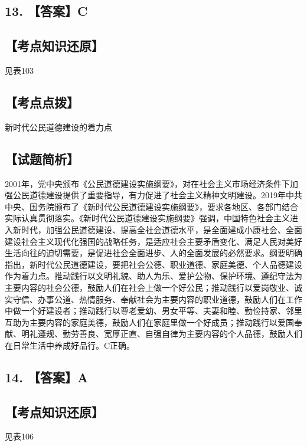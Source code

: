\documentclass[UTF8,11pt]{ctexart}
\begin{document}
\subsection*{13. 【答案】C}

\subsection*{【考点知识还原】}

见表103


\subsection*{【考点点拨】}

新时代公民道德建设的着力点


\subsection*{【试题简析】}

2001年，党中央颁布《公民道德建设实施纲要》，对在社会主义市场经济条件下加强公民道德建设提供了重要指导，有力促进了社会主义精神文明建设。2019年中共中央、国务院颁布了《新时代公民道德建设实施纲要》，要求各地区、各部门结合实际认真贯彻落实。《新时代公民道德建设实施纲要》强调，中国特色社会主义进入新时代，加强公民道德建设、提高全社会道德水平，是全面建成小康社会、全面建设社会主义现代化强国的战略任务，是适应社会主要矛盾变化、满足人民对美好生活向往的迫切需要，是促进社会全面进步、人的全面发展的必然要求。纲要明确指出，新时代公民道德建设，要把社会公德、职业道德、家庭美德、个人品德建设作为着力点。推动践行以文明礼貌、助人为乐、爱护公物、保护环境、遵纪守法为主要内容的社会公德，鼓励人们在社会上做一个好公民；推动践行以爱岗敬业、诚实守信、办事公道、热情服务、奉献社会为主要内容的职业道德，鼓励人们在工作中做一个好建设者；推动践行以尊老爱幼、男女平等、夫妻和睦、勤俭持家、邻里互助为主要内容的家庭美德，鼓励人们在家庭里做一个好成员；推动践行以爱国奉献、明礼遵规、勤劳善良、宽厚正直、自强自律为主要内容的个人品德，鼓励人们在日常生活中养成好品行。C正确。


\subsection*{14. 【答案】A}

\subsection*{【考点知识还原】}

见表106
\end{document}
